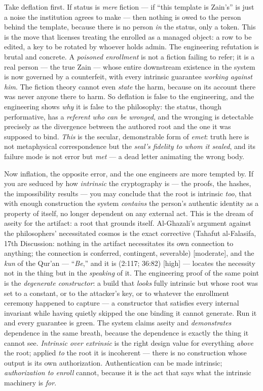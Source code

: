 \documentclass[11pt]{article}
\begin{document}
Take deflation first. If status is \emph{mere} fiction — if ``this template is Zain's'' is just a noise the institution agrees to make — then nothing is owed to the person behind the template, because there is no person \emph{in} the status, only a token. This is the move that licenses treating the enrolled as a managed object: a row to be edited, a key to be rotated by whoever holds admin. The engineering refutation is brutal and concrete. A \emph{poisoned enrollment} is not a fiction failing to refer; it is a real person — the true Zain — whose entire downstream existence in the system is now governed by a counterfeit, with every intrinsic guarantee \emph{working against him}. The fiction theory cannot even \emph{state} the harm, because on its account there was never anyone there to harm. So deflation is false to the engineering, and the engineering shows \emph{why} it is false to the philosophy: the status, though performative, has a \emph{referent who can be wronged}, and the wronging is detectable precisely as the divergence between the authored root and the one it was supposed to bind. \emph{This} is the secular, demonstrable form of \emph{emet}: truth here is not metaphysical correspondence but the \emph{seal's fidelity to whom it sealed}, and its failure mode is not error but \emph{met} — a dead letter animating the wrong body.

Now inflation, the opposite error, and the one engineers are more tempted by. If you are seduced by how \emph{intrinsic} the cryptography is — the proofs, the hashes, the impossibility results — you may conclude that the root is intrinsic \emph{too}, that with enough construction the system \emph{contains} the person's authentic identity as a property of itself, no longer dependent on any external act. This is the dream of aseity for the artifact: a root that grounds itself. Al-Ghazali's argument against the philosophers' necessitated cosmos is the exact corrective (Tahafut al-Falasifa, 17th Discussion: nothing in the artifact necessitates its own connection to anything; the connection is conferred, contingent, severable) [moderate], and the \emph{kun} of the Qur'an — ``\emph{Be},'' and it is (2:117; 36:82) [high] — locates the necessity not in the thing but in the \emph{speaking} of it. The engineering proof of the same point is the \emph{degenerate constructor}: a build that \emph{looks} fully intrinsic but whose root was set to a constant, or to the attacker's key, or to whatever the enrollment ceremony happened to capture — a constructor that satisfies every internal invariant while having quietly skipped the one binding it cannot generate. Run it and every guarantee is green. The system claims aseity and \emph{demonstrates} dependence in the same breath, because the dependence is exactly the thing it cannot see. \emph{Intrinsic over extrinsic} is the right design value for everything \emph{above} the root; applied \emph{to} the root it is incoherent — there is no construction whose output is its own authorization. Authentication can be made intrinsic; \emph{authorization to enroll} cannot, because it is the act that says what the intrinsic machinery is \emph{for}.
\end{document}
